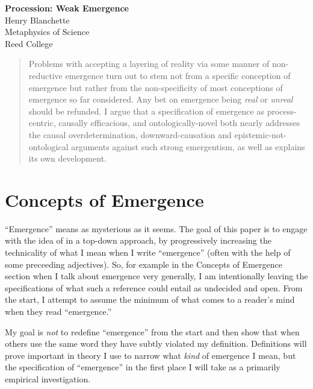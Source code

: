\documentclass{article}
\newcommand{\ti}[1]{\textit{#1}}
\begin{document}

\begin{center}
	\huge{\bf Procession: Weak Emergence} %
    \\[0.75cm] 
	\large{Henry Blanchette} %
    \\[0.5cm]
	\large{Metaphysics of Science \\ Reed College} %
    \\[1.0cm]
\end{center}

\begin{abstract}
	Problems with accepting a layering of reality via some manner of non-reductive emergence turn out to stem not from a specific conception of emergence but rather from the non-specificity of most conceptions of emergence so far considered. Any bet on emergence being \ti{real} or \ti{unreal} should be refunded. I argue that a specification of emergence as process-centric, causally efficacious, and ontologically-novel both nearly addresses the causal overdetermination, downward-causation and epistemic-not-ontological arguments against such strong emergentism, as well as explains its own development.
\end{abstract}

\section{Concepts of Emergence}

``Emergence'' means as mysterious as it seems. The goal of this paper is to engage with the idea of in a top-down approach, by progressively increasing the technicality of what I mean when I write ``emergence'' (often with the help of some preceeding adjectives). So, for example in the Concepts of Emergence section when I talk about emergence very generally, I am intentionally leaving the specifications of what such a reference could entail as undecided and open. From the start, I attempt to assume the minimum of what comes to a reader's mind when they read ``emergence.''

My goal is \ti{not} to redefine ``emergence'' from the start and then show that when others use the same word they have subtly violated my definition. Definitions will prove important in theory I use to narrow what \ti{kind} of emergence I mean, but the specification of ``emergence'' in the first place I will take as a primarily empirical investigation.
\end{document}
